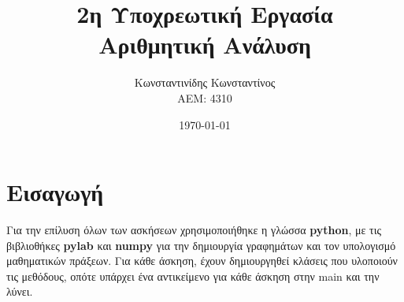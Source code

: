 \documentclass[a4paper,11pt]{article}
\title{2η Υποχρεωτική Εργασία \\ Αριθμητική Ανάλυση}
\author{Κωνσταντινίδης Κωνσταντίνος  \\ ΑΕΜ: 4310}
\date{\today}
\newcommand{\lt}{\latintext}
\begin{document}
\maketitle

\section*{Εισαγωγή}
    Για την επίλυση όλων των ασκήσεων χρησιμοποιήθηκε η γλώσσα {\textbf{{\lt python}}, με τις 
    βιβλιοθήκες {\textbf{\lt pylab}}  και {\textbf{\lt numpy}}  για την δημιουργία γραφημάτων και τον υπολογισμό μαθηματικών πράξεων. Για κάθε άσκηση, έχουν δημιουργηθεί κλάσεις που υλοποιούν τις 
    μεθόδους, οπότε υπάρχει ένα αντικείμενο για κάθε άσκηση στην {\lt main} και την λύνει.
}
\end{document}
